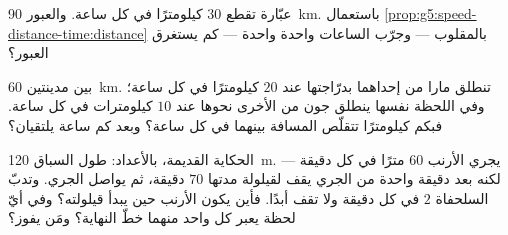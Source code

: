 \begin{exercise}[$\star\star$]\label{exo:g5:speed-distance-time:9}
عبّارة تقطع $30$ كيلومترًا في كل ساعة. والعبور \qty{90}{km}.
باستعمال \cref{prop:g5:speed-distance-time:distance} بالمقلوب
--- وجرّب الساعات واحدة واحدة --- كم يستغرق العبور؟
\end{exercise}

\begin{exercise}[$\star\star$]\label{exo:g5:speed-distance-time:10}
بين مدينتين \qty{60}{km}. تنطلق مارا من إحداهما بدرّاجتها عند
$20$ كيلومترًا في كل ساعة؛ وفي اللحظة نفسها ينطلق جون من الأخرى
نحوها عند $10$ كيلومترات في كل ساعة. فبكم كيلومترًا تتقلّص
المسافة بينهما في كل ساعة؟ وبعد كم ساعة يلتقيان؟
\end{exercise}

\begin{exercise}[$\star\star$]\label{exo:g5:speed-distance-time:11}
الحكاية القديمة، بالأعداد: طول السباق \qty{120}{m}. يجري الأرنب
$60$ مترًا في كل دقيقة --- لكنه بعد دقيقة واحدة من الجري يقف
لقيلولة مدتها $70$ دقيقة، ثم يواصل الجري. وتدبّ السلحفاة $2$
 في كل دقيقة ولا تقف أبدًا. فأين يكون الأرنب حين يبدأ
قيلولته؟ وفي أيّ لحظة يعبر كل واحد منهما خطّ النهاية؟ ومَن
يفوز؟
\end{exercise}
